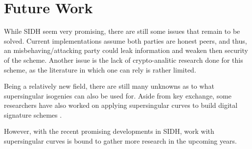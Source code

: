 \documentclass[10pt,twocolumn]{article} %
\begin{document}
\section{Future Work}
While SIDH seem very promising, there are still some issues that remain to be solved. Current implementations assume both parties are honest peers, and thus, an misbehaving/attacking party could leak information and weaken then security of the scheme. Another issue is the lack of crypto-analitic research done for this scheme, as the literature in which one can rely is rather limited.
\par Being a relatively new field, there are still many unknowns as to what supersingular isogenies can also be used for. Aside from key exchange, some researchers have also worked on applying supersingular curves to build digital signature schemes \cite{jao2014isogeny,sun2014toward}. 
\par However, with the recent promising developments in SIDH, work with supersingular curves is bound to gather more research in the upcoming years. 






\nocite{jalali2016quantum}
\end{document}
